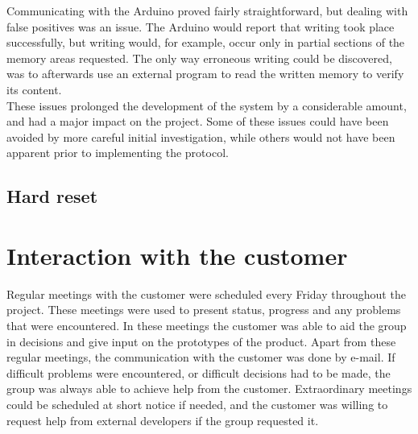 	Communicating with the Arduino proved fairly straightforward, but dealing with false positives was an issue. The Arduino would report that writing took place successfully, but writing would, for example, occur only in partial sections of the memory areas requested. The only way erroneous writing could be discovered, was to afterwards use an external program to read the written memory to verify its content. \\

	These issues prolonged the development of the system by a considerable amount, and had a major impact on the project. Some of these issues could have been avoided by more careful initial investigation, while others would not have been apparent prior to implementing the protocol.

	\subsection{Hard reset}
	\label{hard-reset}

\section{Interaction with the customer}
	Regular meetings with the customer were scheduled every Friday throughout the project. These meetings were used to present status, progress and any problems that were encountered. In these meetings the customer was able to aid the group in decisions and give input on the prototypes of the product. Apart from these regular meetings, the communication with the customer was done by e-mail. If difficult problems were encountered, or difficult decisions had to be made, the group was always able to achieve help from the customer. Extraordinary meetings could be scheduled at short notice if needed, and the customer was willing to request help from external developers if the group requested it.

